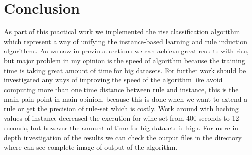 \documentclass{article}
\begin{document}
\section{Conclusion}
As part of this practical work we implemented the rise classification algorithm which represent a way of unifying the 
instance-based learning and rule induction algorithms. As we saw in previous sections we can achieve great results
with rise, but major problem in my opinion is the speed of algorithm because the training time is taking great amount of time
for big datasets. For further work should be investigated any ways of improving the speed of the algorithm like
avoid computing more than one time distance between rule and instance, this is the main pain point in main opinion, because
this is done when we want to extend a rule or get the precision of rule-set which is costly. Work around with hashing
values of instance decreased the execution for wine set from 400 seconds to 12 seconds, but however the amount of time for
big datasets is high. For more in-depth investigation of the results we can check the output files in the  directory
where can see complete image of output of the algorithm. 

% 
\end{document}
